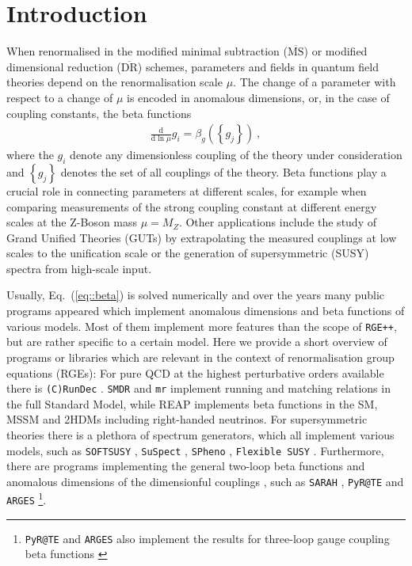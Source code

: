 \documentclass[11pt,a4paper]{article}
\begin{document}
\section{Introduction}
When renormalised in the modified minimal subtraction ($\overline{\mathrm{MS}}$) or modified dimensional reduction ($\overline{\mathrm{DR}}$) schemes,
parameters and fields in quantum field theories depend on the renormalisation scale $\mu$. The change of a parameter with respect to a change of $\mu$
is encoded in anomalous dimensions, or, in the case of coupling constants, the beta functions
\begin{align}
\frac{\mathrm{d}}{\mathrm{d}\ln\mu}g_i = \beta_g\left(\left\{g_j\right\}\right)~,
\label{eq::beta}
\end{align}
where the $g_i$ denote any dimensionless coupling of the theory under consideration and $\left\{g_j\right\}$ denotes the set of
all couplings of the theory.
Beta functions play a crucial role in connecting parameters at different scales, for example when comparing measurements of the
strong coupling constant at different energy scales at the Z-Boson mass $\mu = M_Z$. Other applications include the study of
Grand Unified Theories (GUTs) by extrapolating the measured couplings at low scales to the unification scale or the generation
of supersymmetric (SUSY) spectra from high-scale input.

Usually, Eq.~(\ref{eq::beta}) is solved numerically and over the years many public programs appeared which implement
anomalous dimensions and beta functions of various models. Most of them implement more features than the scope of \texttt{RGE++}, but are rather specific to a certain model. 
Here we provide a short overview of programs or libraries which are relevant in the context of renormalisation group equations (RGEs):
For pure QCD at the highest perturbative orders available there is \texttt{(C)RunDec} \cite{Chetyrkin:2000yt,Schmidt:2012az,Herren:2017osy}. \texttt{SMDR} \cite{Martin:2019lqd} and \texttt{mr} \cite{Kniehl:2016enc}
implement running and matching relations in the full Standard Model,
while REAP \cite{Antusch:2005gp} implements beta functions in the SM, MSSM and 2HDMs including right-handed neutrinos. For supersymmetric theories there is a plethora of spectrum generators,
which all implement various models, such as \texttt{SOFTSUSY} \cite{Allanach:2001kg}, \texttt{SuSpect} \cite{Djouadi:2002ze}, \texttt{SPheno} \cite{Porod:2003um,Porod:2011nf},
\texttt{Flexible SUSY} \cite{Athron:2014yba,Athron:2017fvs}. Furthermore, there are programs implementing the general two-loop beta functions
\cite{Machacek:1983tz,Machacek:1983fi,Machacek:1984zw,Jack:1982hf,Jack:1982sr,Jack:1984vj} and anomalous dimensions of the dimensionful couplings \cite{Luo:2002ti,Sartore:2020pkk}, such
as \texttt{SARAH} \cite{Staub:2013tta}, \texttt{PyR@TE} \cite{Lyonnet:2016xiz,Sartore:2020gou} and \texttt{ARGES} \cite{Litim:2020jvl}\footnote{\texttt{PyR@TE} and \texttt{ARGES} also implement the results for three-loop gauge coupling beta functions \cite{Poole:2019kcm}}.
\end{document}
